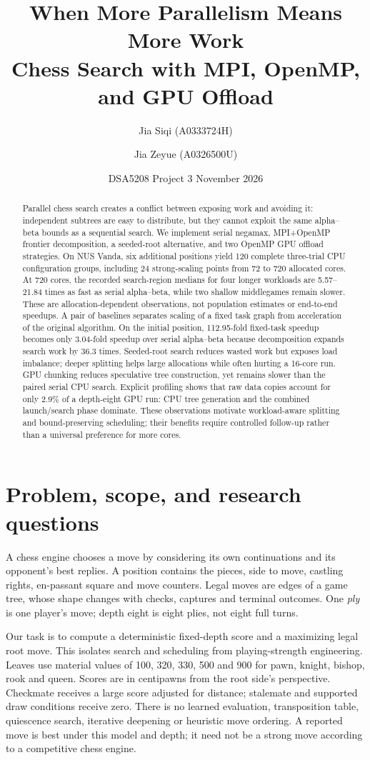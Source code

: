 \documentclass[11pt,a4paper]{article}
\title{When More Parallelism Means More Work\\[3pt]\large Chess Search with MPI, OpenMP, and GPU Offload}
\author{Jia Siqi (A0333724H) \and Jia Zeyue (A0326500U)}
\date{DSA5208 Project 3 \quad 9 November 2026}
\begin{document}
\maketitle
\begin{abstract}
Parallel chess search creates a conflict between exposing work and avoiding it:
independent subtrees are easy to distribute, but they cannot exploit the same
alpha--beta bounds as a sequential search. We implement serial negamax,
MPI+OpenMP frontier decomposition, a seeded-root alternative, and two OpenMP GPU
offload strategies. On NUS Vanda, six additional positions yield 120 complete
three-trial CPU configuration groups, including 24 strong-scaling points from
72 to 720 allocated cores. At 720 cores, the recorded search-region medians for four longer workloads are
5.57--21.84 times as fast as serial alpha--beta, while two shallow middlegames
remain slower. These are allocation-dependent observations, not population
estimates or end-to-end speedups. A pair of baselines separates scaling of a fixed
task graph from acceleration of the original algorithm. On the initial
position, 112.95-fold fixed-task speedup becomes only 3.04-fold speedup over
serial alpha--beta because decomposition expands search work by 36.3 times.
Seeded-root search reduces wasted work but exposes load imbalance; deeper
splitting helps large allocations while often hurting a 16-core run. GPU
chunking reduces speculative tree construction, yet remains slower than the
paired serial CPU search. Explicit profiling shows that raw data copies account
for only 2.9\% of a depth-eight GPU run: CPU tree generation and the combined
launch/search phase dominate. These observations motivate workload-aware splitting and bound-preserving
scheduling; their benefits require controlled follow-up rather than a universal
preference for more cores.
\end{abstract}

\section{Problem, scope, and research questions}
A chess engine chooses a move by considering its own continuations and its
opponent's best replies. A position contains the pieces, side to move, castling
rights, en-passant square and move counters. Legal moves are edges of a game
tree, whose shape changes with checks, captures and terminal outcomes. One
\emph{ply} is one player's move; depth eight is eight plies, not eight full turns.

Our task is to compute a deterministic fixed-depth score and a maximizing legal
root move. This isolates search and scheduling from playing-strength engineering.
Leaves use material values of 100, 320, 330, 500 and 900 for pawn, knight,
bishop, rook and queen. Scores are in centipawns from the root side's perspective.
Checkmate receives a large score adjusted for distance; stalemate and supported
draw conditions receive zero. There is no learned evaluation, transposition
table, quiescence search, iterative deepening or heuristic move ordering.
A reported move is best under this model and depth; it need not be a strong
move according to a competitive chess engine.
\end{document}
